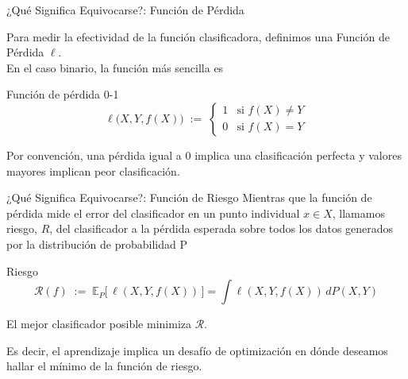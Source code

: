 \documentclass[aspectratio=169, 10pt]{beamer}
\begin{document}
\begin{frame}{¿Qué Significa Equivocarse?: Función de Pérdida}

  Para medir la efectividad de la función clasificadora, definimos una Función de Pérdida $\ell$.\\
\pause
  En el caso binario, la función más sencilla es
\begin{block}{Función de pérdida 0-1}
  \Large
  \[
          \ell\bigl(X,Y,f(X)\bigr) \;:=\;
        \begin{cases}
          1 & \text{si } f(X) \neq Y \\
          0 & \text{si } f(X) = Y
        \end{cases}
      \]
\end{block}
\pause
Por convención, una pérdida igual a 0 implica una clasificación perfecta y valores
mayores implican peor clasificación. \\

\end{frame}
\begin{frame}{¿Qué Significa Equivocarse?: Función de Riesgo}
Mientras que la función de pérdida mide el error del clasificador en un punto
individual $x \in X$, llamamos riesgo, $R$, del clasificador a la pérdida esperada
sobre todos los datos generados por la distribución de probabilidad P
\pause
      \begin{block}{Riesgo}
        \Large
      \[
        \mathcal{R}(f)
        \;:=\;
        \mathbb{E}_P\bigl[\,\ell(X,Y,f(X))\,\bigr] = \int \ell(X,Y,f(X))\,dP(X,Y)
      \]

      \end{block}
\pause
\bigskip
El mejor clasificador posible minimiza $\mathcal{R}$.\\

\pause
\bigskip
\begin{alertblock}{ }
  Es decir, el aprendizaje implica un desafío de optimización en dónde deseamos hallar el mínimo de la función de
riesgo.
\end{alertblock}

\end{frame}



\end{document}
